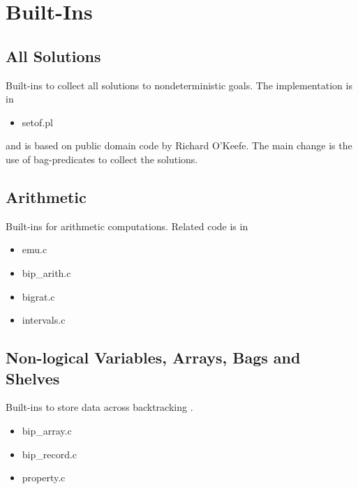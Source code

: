 %
% 
% 
% 
% 

\chapter{Built-Ins}

\section{All Solutions }
     Built-ins to collect all solutions to nondeterministic goals.
     The implementation is in
     \begin{itemize}
     \item setof.pl
     \end{itemize}
     and is based on
     public domain code by Richard O'Keefe. The main change is the
     use of {\eclipse} bag-predicates to collect the solutions.

\section{Arithmetic }
     Built-ins for arithmetic computations. Related code is in
     \begin{itemize}
     \item emu.c
     \item bip_arith.c
     \item bigrat.c
     \item intervals.c
     \end{itemize}


\section{Non-logical Variables, Arrays, Bags and Shelves }
     Built-ins to store data across backtracking .
     \begin{itemize}
     \item bip_array.c
     \item bip_record.c
     \item property.c
     \end{itemize}

